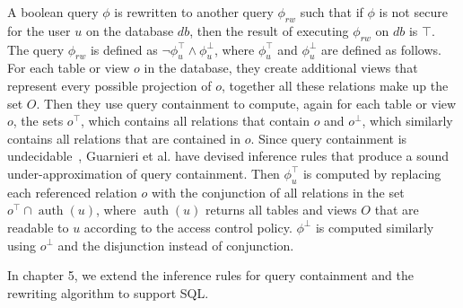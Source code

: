 A boolean query $\phi$ is rewritten to another query $\phi_{rw}$ such that if $\phi$ is not secure for the user $u$ on the database $db$, then the result of executing $\phi_{rw}$ on $\mathit{db}$ is $\top$.
%
The query $\phi_{rw}$ is defined as $\lnot \phi^\top_u \land \phi^\bot_u$, where $\phi^\top_u$ and $\phi^\bot_u$ are defined as follows.
%
For each table or view $o$ in the database, they create additional views that represent every possible projection of $o$, together all these relations make up the set $O$.
%
Then they use query containment to compute, again for each table or view $o$, the sets $o^\top$, which contains all relations that contain $o$ and $o^\bot$, which similarly contains all relations that are contained in $o$.
%
Since query containment is undecidable~\cite{abiteboul1995foundations}, Guarnieri et al. have devised inference rules that produce a sound under-approximation of query containment.
%
Then $\phi^\top_u$ is computed by replacing each referenced relation $o$ with the conjunction of all relations in the set $o^\top \cap \operatorname{auth}(u)$, where $\operatorname{auth}(u)$ returns all tables and views $O$ that are readable to $u$ according to the access control policy.  
%
$\phi^\bot$ is computed similarly using $o^\bot$ and the disjunction instead of conjunction.

In chapter 5, we extend the inference rules for query containment and the rewriting algorithm to support SQL.